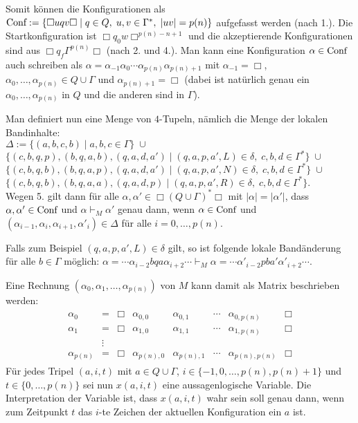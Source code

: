 \begin{Beweis}
    Somit können die Konfigurationen als
    $\text{Conf} := \{\Box uqv \Box \;|\; q \in Q,\; u, v \in \Gamma^\ast,\; |uv| = p(n)\}$
    aufgefasst werden (nach 1.).
    Die Startkonfiguration ist $\Box q_0 w \Box^{p(n)-n+1}$
    und die akzeptierende Konfigurationen sind aus $\Box q_f \Gamma^{p(n)} \Box$
    (nach 2. und 4.).
    Man kann eine Konfiguration $\alpha \in \text{Conf}$ auch schreiben als
    $\alpha = \alpha_{-1} \alpha_{0} \dotsb \alpha_{p(n)} \alpha_{p(n)+1}$
    mit $\alpha_{-1} = \Box$, $\alpha_{0}, \dotsc, \alpha_{p(n)} \in Q \cup \Gamma$ und
    $\alpha_{p(n)+1} = \Box$
    (dabei ist natürlich genau ein $\alpha_{0}, \dotsc, \alpha_{p(n)}$
    in $Q$ und die anderen sind in $\Gamma$).

    Man definiert nun eine Menge von $4$-Tupeln, nämlich die Menge der lokalen Bandinhalte:\\
    $\Delta := \{(a, b, c, b) \;|\; a, b, c \in \Gamma\} \;\cup$\\
    $\{(c, b, q, p), (b, q, a, b), (q, a, d, a') \;|\; (q, a, p, a', L) \in \delta,\;
    c, b, d \in \Gamma^\ast\} \;\cup$\\
    $\{(c, b, q, b), (b, q, a, p), (q, a, d, a') \;|\; (q, a, p, a', N) \in \delta,\;
    c, b, d \in \Gamma^\ast\} \;\cup$\\
    $\{(c, b, q, b), (b, q, a, a), (q, a, d, p) \;|\; (q, a, p, a', R) \in \delta,\;
    c, b, d \in \Gamma^\ast\}$.\\
    Wegen 5. gilt dann für alle $\alpha, \alpha' \in \Box (Q \cup \Gamma)^\ast \Box$ mit
    $|\alpha| = |\alpha'|$,
    dass $\alpha, \alpha' \in \text{Conf}$ und $\alpha \vdash_M \alpha'$ genau dann, wenn
    $\alpha \in \text{Conf}$ und
    $(\alpha_{i-1}, \alpha_{i}, \alpha_{i+1}, \alpha'_{i}) \in \Delta$
    für alle $i = 0, \dotsc, p(n)$.

    Falls zum Beispiel $(q, a, p, a', L) \in \delta$ gilt, so ist folgende lokale Bandänderung
    für alle $b \in \Gamma$ möglich:
    $\alpha = \dotsb \alpha_{i-2} b q a \alpha_{i+2} \dotsb \vdash_M
    \alpha = \dotsb \alpha'_{i-2} p b a' \alpha'_{i+2} \dotsb$.

    Eine Rechnung $(\alpha_0, \alpha_1, \dotsc, \alpha_{p(n)})$ von $M$ kann damit als Matrix
    beschrieben werden:
    \begin{align*}\begin{array}{cccccccc}
        \alpha_0 & = & \Box & \alpha_{0,0} & \alpha_{0,1} & \dotsb & \alpha_{0,p(n)} & \Box\\
        \alpha_1 & = & \Box & \alpha_{1,0} & \alpha_{1,1} & \dotsb & \alpha_{1,p(n)} & \Box\\
        & \vdots\\
        \alpha_{p(n)} & = & \Box & \alpha_{p(n),0} & \alpha_{p(n),1} & \dotsb &
        \alpha_{p(n),p(n)} & \Box
    \end{array}\end{align*}
    Für jedes Tripel $(a, i, t)$ mit $a \in Q \cup \Gamma$,
    $i \in \{-1, 0, \dotsc, p(n), p(n) + 1\}$ und $t \in \{0, \dotsc, p(n)\}$ sei nun
    $x(a, i, t)$ eine aussagenlogische Variable.
    Die Interpretation der Variable ist, dass $x(a, i, t)$ wahr sein soll genau dann, wenn
    zum Zeitpunkt $t$ das $i$-te Zeichen der aktuellen Konfiguration ein $a$ ist.


\end{Beweis}
